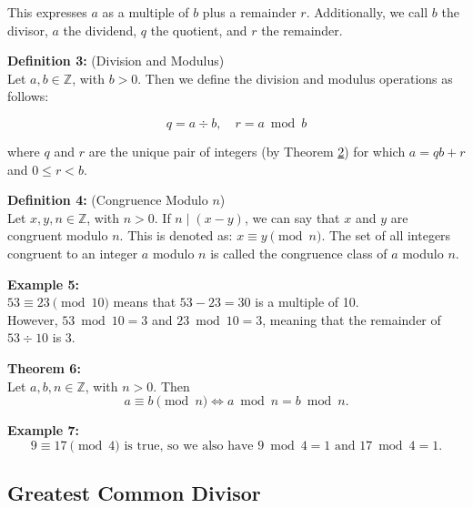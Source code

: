 \documentclass[12pt]{article}
\begin{document}
\noindent This expresses $a$ as a multiple of $b$ plus a remainder $r$.
Additionally, we call $b$ the divisor, $a$ the dividend, $q$ the quotient, and $r$ the remainder.

\vspace{5mm}

\noindent\textbf{Definition 3:} (Division and Modulus)
\label{def:divmod}
\\Let $a, b \in \mathbb{Z}$, with $b > 0$. 
Then we define the division and modulus operations as follows:

\[
q = a \div b, \quad r = a \bmod b
\]

where $q$ and $r$ are the unique pair of integers (by Theorem \hyperref[thm:division]{2}) for which $a = qb + r$ and $0 \leq r < b$.

\vspace{5mm}

\noindent\textbf{Definition 4:} (Congruence Modulo $n$)
\label{def:congruence}
\\Let $x,y,n \in \mathbb{Z}$, with $n > 0$. If $n \mid (x - y)$, we can say that $x$ and $y$ are congruent modulo $n$. 
This is denoted as: $x \equiv y \pmod{n}$.
The set of all integers congruent to an integer $a$ modulo $n$ is called the congruence class of $a$ modulo $n$.

\vspace{5mm}

\noindent\textbf{Example 5:} 
\label{ex:modexample}
\\ $53 \equiv 23 \pmod{10}$ means that $53-23=30$ is a multiple of 10. 
\\However, $53 \bmod 10 = 3$ and $23 \bmod 10 = 3$, meaning that the remainder of $53 \div 10$ is $3$.

\vspace{5mm}

\noindent\textbf{Theorem 6:} 
\label{thm:modiff}
\\Let $a,b,n \in \mathbb{Z}$, with $n > 0$. 
Then 
\[
a \equiv b \pmod{n} \iff a \bmod n = b \bmod n.
\]

\vspace{5mm}

\noindent\textbf{Example 7:}
\label{ex:modexample2}
\[
9 \equiv 17 \pmod{4} \text{ is true, so we also have } 
9\bmod 4 = 1 \text{ and } 17 \bmod 4 = 1.
\]

\vspace{15mm}

\subsection{Greatest Common Divisor}
\end{document}
